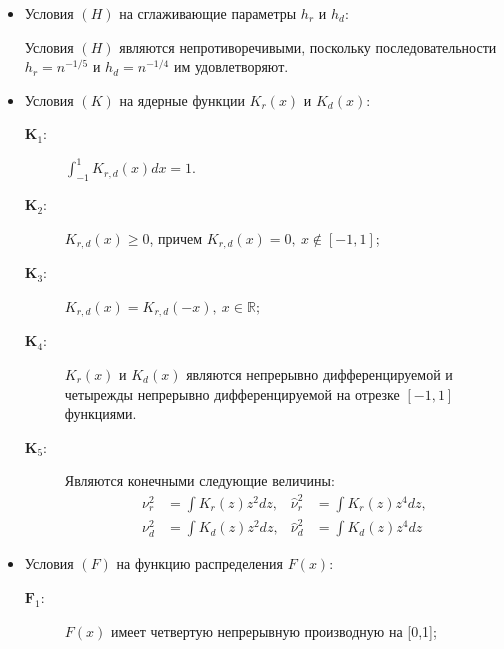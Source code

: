 \documentclass[a4paper,14pt,russian]{article}
\begin{document}
\begin{itemize}
\item
Условия $(H)$ на сглаживающие параметры $h_r$ и $h_d$:
Условия $(H)$ являются непротиворечивыми, поскольку последовательности $h_r = n^{-1/5}$ и $h_d=n^{-1/4}$ им удовлетворяют.
\item
Условия $(K)$ на ядерные функции $K_r(x)$ и $K_d(x)$:
\begin{description}

\item[$\mathbf K_1:$]
$\int_{-1}^1 K_{r,d}(x)dx=1.$

\item[$\mathbf K_2:$]
$K_{r,d}(x)\geq 0$, причем $K_{r,d}(x)=0,\ x \notin [-1,1]$;

\item[$\mathbf K_3:$]
$K_{r,d}(x)=K_{r,d}(-x),\ x \in \mathbb R;$

\item[$\mathbf K_4:$]
$K_r(x)$ и $K_d(x)$ являются непрерывно дифференцируемой и  четырежды непрерывно дифференцируемой на отрезке $[-1,1]$ функциями.
\item[$\mathbf K_5:$]
Являются конечными следующие величины:
\begin{align*}
\nu_r^2 &= \int K_r(z)z^2dz, & \hat{\nu}_r^2 &= \int K_r(z)z^4dz,\\ \nu_d^2 &= \int K_d(z)z^2dz, &\hat{\nu}_d^2 &= \int K_d(z)z^4dz
\end{align*}\label{nu}

\end{description}


\item
Условия $(F)$ на функцию распределения $F(x)$:
\begin{description}

\item[$\mathbf F_1:$]
$F(x)$ имеет четвертую непрерывную производную на [0,1];


\end{description}
\end{itemize}
\end{document}
